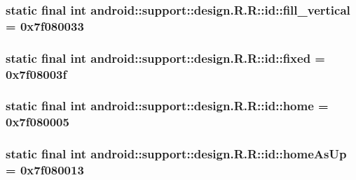 \hypertarget{classandroid_1_1support_1_1design_1_1_r_1_1id_d410a46e6f43a0d677a0fd6ba5125638}{
\subsubsection[{fill\_\-vertical}]{\setlength{\rightskip}{0pt plus 5cm}static final int android::support::design.R.R::id::fill\_\-vertical = 0x7f080033}}
\label{classandroid_1_1support_1_1design_1_1_r_1_1id_d410a46e6f43a0d677a0fd6ba5125638}


\hypertarget{classandroid_1_1support_1_1design_1_1_r_1_1id_d37099d65cd81d819317ce3a42f81fa4}{
\subsubsection[{fixed}]{\setlength{\rightskip}{0pt plus 5cm}static final int android::support::design.R.R::id::fixed = 0x7f08003f}}
\label{classandroid_1_1support_1_1design_1_1_r_1_1id_d37099d65cd81d819317ce3a42f81fa4}


\hypertarget{classandroid_1_1support_1_1design_1_1_r_1_1id_2015c4bd94471aea91b63dd4f91105d9}{
\subsubsection[{home}]{\setlength{\rightskip}{0pt plus 5cm}static final int android::support::design.R.R::id::home = 0x7f080005}}
\label{classandroid_1_1support_1_1design_1_1_r_1_1id_2015c4bd94471aea91b63dd4f91105d9}


\hypertarget{classandroid_1_1support_1_1design_1_1_r_1_1id_d32f619e45b5fa061d7f9a57e621e61f}{
\subsubsection[{homeAsUp}]{\setlength{\rightskip}{0pt plus 5cm}static final int android::support::design.R.R::id::homeAsUp = 0x7f080013}}
\label{classandroid_1_1support_1_1design_1_1_r_1_1id_d32f619e45b5fa061d7f9a57e621e61f}


